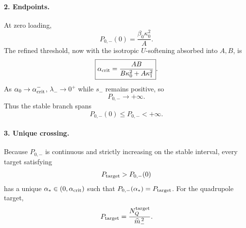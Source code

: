 \paragraph{2. Endpoints.}
At zero loading,
\begin{equation}
\label{eq:app-stage031-P-zero}
P_{0,-}(0)=\frac{\beta_0\kappa_0^2}{A}.
\end{equation}
The refined threshold, now with the isotropic \(U\)-softening absorbed into \(A,B\), is
\begin{equation}
\label{eq:app-stage031-alpha-crit}
\boxed{
\alpha_{\rm crit}=\frac{AB}{B\kappa_0^2+A\kappa_1^2}}.
\end{equation}
As \(\alpha_0\to\alpha_{\rm crit}^-\), \(\lambda_-\to0^+\) while \(s_-\) remains positive, so
\begin{equation}
P_{0,-}\to+\infty.
\end{equation}
Thus the stable branch spans
\begin{equation}
\label{eq:app-stage031-range}
P_{0,-}(0)\leq P_{0,-}<+\infty.
\end{equation}

\paragraph{3. Unique crossing.}
Because \(P_{0,-}\) is continuous and strictly increasing on the stable interval, every target satisfying
\begin{equation}
P_{\rm target}>P_{0,-}(0)
\end{equation}
has a unique \(\alpha_*\in(0,\alpha_{\rm crit})\) such that \(P_{0,-}(\alpha_*)=P_{\rm target}\).  For the quadrupole target,
\begin{equation}
P_{\rm target}=\frac{N_Q^{\rm target}}{\widehat m_-^{\,2}}.
\end{equation}




\clearpage

